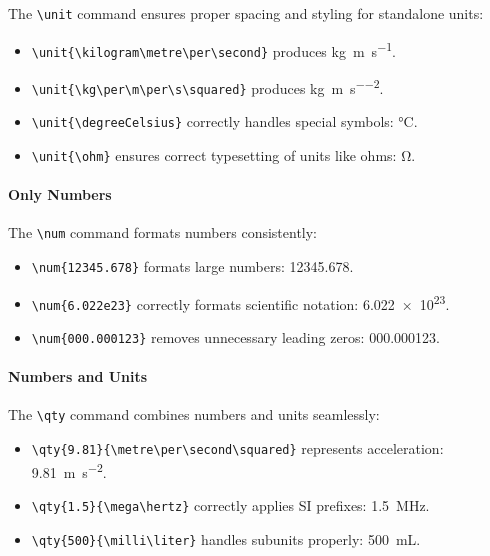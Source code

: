     The \verb|\unit| command ensures proper spacing and styling for standalone units:
    \begin{itemize}
        \item \verb|\unit{\kilogram\metre\per\second}| produces \unit{\kilogram\metre\per\second}.
        \item \verb|\unit{\kg\per\m\per\s\squared}| produces \unit{\kg\per\m\per\s\squared}.
        \item \verb|\unit{\degreeCelsius}| correctly handles special symbols: \unit{\degreeCelsius}.
        \item \verb|\unit{\ohm}| ensures correct typesetting of units like ohms: \unit{\ohm}.
    \end{itemize}

    \paragraph*{Only Numbers}

    The \verb|\num| command formats numbers consistently:
    \begin{itemize}
        \item \verb|\num{12345.678}| formats large numbers: \num{12345.678}.
        \item \verb|\num{6.022e23}| correctly formats scientific notation: \num{6.022e23}.
        \item \verb|\num{000.000123}| removes unnecessary leading zeros: \num{000.000123}.
    \end{itemize}

    \paragraph*{Numbers and Units}

    The \verb|\qty| command combines numbers and units seamlessly:
    \begin{itemize}
        \item \verb|\qty{9.81}{\metre\per\second\squared}| represents acceleration: \qty{9.81}{\metre\per\second\squared}.
        \item \verb|\qty{1.5}{\mega\hertz}| correctly applies SI prefixes: \qty{1.5}{\mega\hertz}.
        \item \verb|\qty{500}{\milli\liter}| handles subunits properly: \qty{500}{\milli\liter}.
    \end{itemize}

